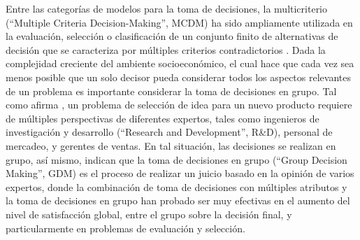 Entre las categorías de modelos para la toma de decisiones,  la multicriterio (``Multiple Criteria Decision-Making'', MCDM) ha sido ampliamente utilizada en la evaluación, selección o clasificación de un conjunto finito de alternativas de decisión que se caracteriza por múltiples criterios contradictorios \cite[]{hwang2012multiple}.  Dada la complejidad creciente del ambiente socioeconómico, el cual hace que cada vez sea menos posible que un solo decisor pueda considerar todos los aspectos relevantes de un problema \cite[ p. 146]{yue2011extended} es importante considerar la toma de decisiones en grupo.  Tal como afirma \citet[ p. 3234]{mousavi2013hierarchical}, un problema de selección de idea para un nuevo producto requiere de múltiples perspectivas de diferentes expertos, tales como ingenieros de investigación y desarrollo (``Research and Development'', R\&D), personal de mercadeo, y gerentes de ventas.  En tal situación, las decisiones se realizan en grupo, así mismo, indican que la toma de decisiones en grupo (``Group Decision Making'', GDM) es el proceso de realizar un juicio basado en la opinión de varios expertos,  donde la combinación de toma de decisiones con múltiples atributos y la toma de decisiones en grupo han probado ser muy efectivas en el aumento del nivel de satisfacción global, entre el grupo sobre la decisión final, y particularmente en problemas de evaluación y selección.\\
